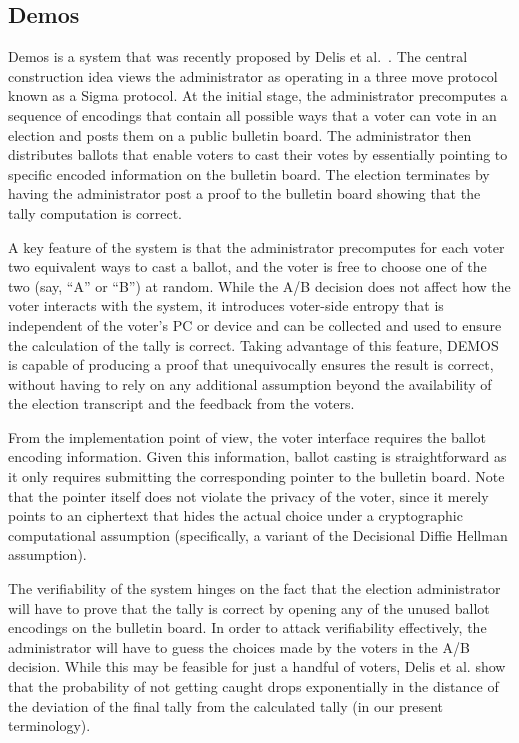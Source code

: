 \subsection{Demos}

Demos is a system that was recently proposed by Delis et
al.~\cite{kiayias2014}. The central construction idea views the
administrator as operating in a three move protocol known as a Sigma
protocol. At the initial stage, the administrator precomputes a
sequence of encodings that contain all possible ways that a voter can
vote in an election and posts them on a public bulletin board. The
administrator then distributes ballots that enable voters to cast
their votes by essentially pointing to specific encoded information on
the bulletin board. The election terminates by having the
administrator post a proof to the bulletin board showing that the
tally computation is correct.

A key feature of the system is that the administrator precomputes for
each voter two equivalent ways to cast a ballot, and the voter is free
to choose one of the two (say, ``A'' or ``B'') at random. While the
A/B decision does not affect how the voter interacts with the system,
it introduces voter-side entropy that is independent of the voter's PC
or device and can be collected and used to ensure the calculation of
the tally is correct. Taking advantage of this feature, DEMOS is
capable of producing a proof that unequivocally ensures the result is
correct, without having to rely on any additional assumption beyond
the availability of the election transcript and the feedback from the
voters.

From the implementation point of view, the voter interface requires
the ballot encoding information. Given this information, ballot
casting is straightforward as it only requires submitting the
corresponding pointer to the bulletin board. Note that the pointer
itself does not violate the privacy of the voter, since it merely
points to an ciphertext that hides the actual choice under a
cryptographic computational assumption (specifically, a variant of the
Decisional Diffie Hellman assumption).

The verifiability of the system hinges on the fact that the election
administrator will have to prove that the tally is correct by opening
any of the unused ballot encodings on the bulletin board. In order to
attack verifiability effectively, the administrator will have to guess
the choices made by the voters in the A/B decision. While this may be
feasible for just a handful of voters, Delis et al. show that the
probability of not getting caught drops exponentially in the distance
of the deviation of the final tally from the calculated tally (in our
present terminology).


